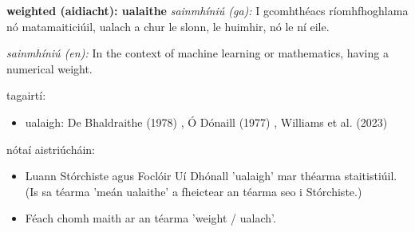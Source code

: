 \documentclass{article}
\begin{document}
\textbf{weighted (aidiacht): ualaithe}
\textit{sainmhíniú (ga):} I gcomhthéacs ríomhfhoghlama nó matamaiticiúil, ualach a chur le slonn, le huimhir, nó le ní eile.

\textit{sainmhíniú (en):} In the context of machine learning or mathematics, having a numerical weight.

tagairtí:
\begin{itemize}
	\item ualaigh: De Bhaldraithe (1978) \cite{de-bhaldraithe}, Ó Dónaill (1977) \cite{odonaill}, Williams et al. (2023) \cite{storchiste}
\end{itemize}

nótaí aistriúcháin:
\begin{itemize}
	\item Luann Stórchiste agus Foclóir Uí Dhónall 'ualaigh' mar théarma staitistiúil. (Is sa téarma 'meán ualaithe' a fheictear an téarma seo i Stórchiste.)
	\item Féach chomh maith ar an téarma 'weight / ualach'.
\end{itemize}



            \printbibliography[title={Tagairtí}]
            
\end{document}
